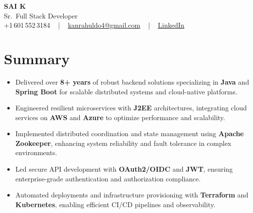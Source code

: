\documentclass[letterpaper,11pt]{article}
\newcommand{\resumeItem}[1]{
  \item\footnotesize{
    {#1 \vspace{-2pt}}
  }
}
\newcommand{\resumeItemListStart}{\begin{itemize}[leftmargin=*]}
\newcommand{\resumeItemListEnd}{\end{itemize}\vspace{-5pt}}
\begin{document}
\begin{center}
    {\fontsize{14pt}{12pt}\selectfont \textbf{\MakeUppercase{Sai K}}}\\ \vspace{2pt}
    \fontsize{10pt}{12pt}\selectfont Sr.\ Full Stack Developer\\ \vspace{2pt}
    \fontsize{10pt}{12pt}\selectfont +1\,601\,552\,3184 ~ | ~
    \href{mailto:kanrahuldo4@gmail.com}{kanrahuldo4@gmail.com} ~ | ~
    \href{https://www.linkedin.com/in/srrrk/}{\color{blue}\underline{LinkedIn}}
    \vspace{-10pt}
\end{center}

\section{Summary}
\fontsize{9pt}{10pt}\selectfont
\resumeItemListStart
  \resumeItem{Delivered over \textbf{8+ years} of robust backend solutions specializing in \textbf{Java} and \textbf{Spring Boot} for scalable distributed systems and cloud-native platforms.}
  \resumeItem{Engineered resilient microservices with \textbf{J2EE} architectures, integrating cloud services on \textbf{AWS} and \textbf{Azure} to optimize performance and scalability.}
  \resumeItem{Implemented distributed coordination and state management using \textbf{Apache Zookeeper}, enhancing system reliability and fault tolerance in complex environments.}
  \resumeItem{Led secure API development with \textbf{OAuth2/OIDC} and \textbf{JWT}, ensuring enterprise-grade authentication and authorization compliance.}
  \resumeItem{Automated deployments and infrastructure provisioning with \textbf{Terraform} and \textbf{Kubernetes}, enabling efficient CI/CD pipelines and observability.}
\resumeItemListEnd
\vspace{-6pt}

\end{document}
